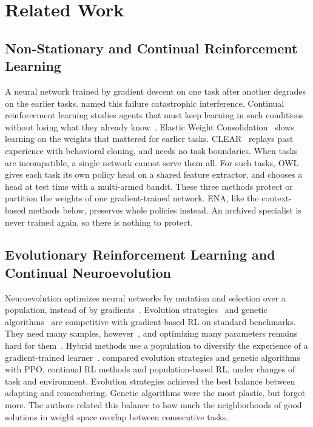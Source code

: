 \section{Related Work}
\label{sec:related}

\subsection{Non-Stationary and Continual Reinforcement Learning}
A neural network trained by gradient descent on one task after another degrades on the earlier tasks. \citet{mccloskey1989catastrophic} named this failure catastrophic interference. Continual reinforcement learning studies agents that must keep learning in such conditions without losing what they already know~\citep{khetarpal2022towards}. Elastic Weight Consolidation~\citep{kirkpatrick2017overcoming} slows learning on the weights that mattered for earlier tasks. CLEAR~\citep{rolnick2019experience} replays past experience with behavioral cloning, and needs no task boundaries. When tasks are incompatible, a single network cannot serve them all. For such tasks, OWL~\citep{kessler2022same} gives each task its own policy head on a shared feature extractor, and chooses a head at test time with a multi-armed bandit. These three methods protect or partition the weights of one gradient-trained network. ENA, like the context-based methods below, preserves whole policies instead. An archived specialist is never trained again, so there is nothing to protect.

\subsection{Evolutionary Reinforcement Learning and Continual Neuroevolution}
Neuroevolution optimizes neural networks by mutation and selection over a population, instead of by gradients~\citep{stanley2019designing}. Evolution strategies~\citep{salimans2017evolution} and genetic algorithms~\citep{such2017deep} are competitive with gradient-based RL on standard benchmarks. They need many samples, however~\citep{khadka2018evolutionary,pourchot2019cemrl}, and optimizing many parameters remains hard for them~\citep{khadka2018evolutionary}. Hybrid methods use a population to diversify the experience of a gradient-trained learner~\citep{khadka2018evolutionary}. \citet{nisioti2026continual} compared evolution strategies and genetic algorithms with PPO, continual RL methods and population-based RL, under changes of task and environment. Evolution strategies achieved the best balance between adapting and remembering. Genetic algorithms were the most plastic, but forgot more. The authors related this balance to how much the neighborhoods of good solutions in weight space overlap between consecutive tasks.

